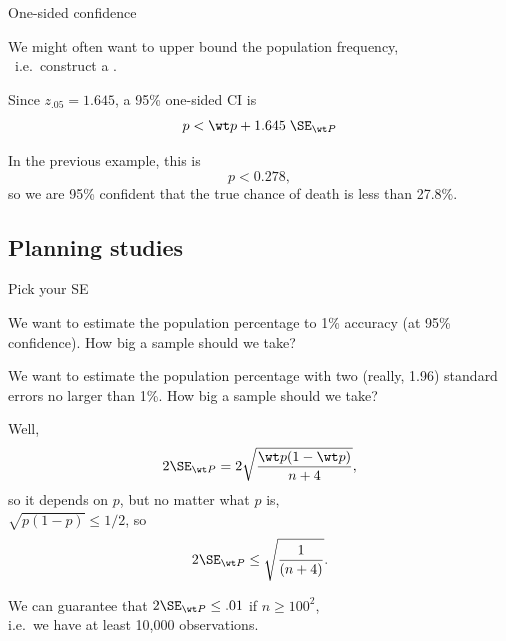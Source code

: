 \begin{frame}{One-sided confidence}

    We might often want to \alert{upper bound} the population frequency,\\\
    i.e.\ construct a .

    \vspace{2em}

    Since $z_{.05} = 1.645$, 
    a \alert{95\% one-sided CI} is 
        \[ p < \wt p + 1.645 \; \SE_{\wt P} \]

    \vspace{2em}

    In the previous example, this is
        \[ p < 0.278 , \]
    so we are 95\% confident that the true chance of death is less than 27.8\%.


\end{frame}

\subsection{Planning studies}

\begin{frame}{Pick your SE}

    We want to estimate the population percentage to \alert{1\% accuracy}
    (at 95\% confidence).
    How big a sample should we take?

    \vspace{2em}
    \pause

     We want to estimate the population percentage
    with two {\tiny (really, 1.96)} standard errors no larger than 1\%.
    How big a sample should we take?

    \vspace{2em}

    Well,
        \[ 2 \SE_{\wt P} = 2 \sqrt{\frac{\wt p (1-\wt p)}{n+4} } ,\]
        so it \alert<1>{depends on $p$}, \pause but \alert<2->{no matter what $p$ is,}\\
    $\sqrt{p (1-p)} \le 1/2$,
    so
    \[ 2 \SE_{\wt P} \le \sqrt{\frac{1}{(n+4)} } .\]

    \vspace{1em}

    We can guarantee that $2 \SE_{\wt P} \le .01$ if $n \ge 100^2$, \\
    i.e.\ we have at least 10,000 observations.


\end{frame}

